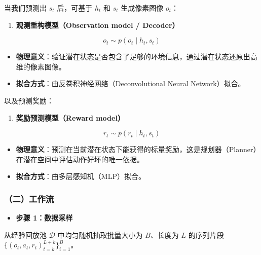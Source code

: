 当我们预测出 \(s_t\) 后，可基于 \(h_t\) 和 \(s_t\) 生成像素图像 \(o_t\)：

\begin{enumerate}
\def\labelenumi{\arabic{enumi}.}
\setcounter{enumi}{3}
\tightlist
\item
  \textbf{观测重构模型（Observation model / Decoder）}
\end{enumerate}

\[
o_t \sim p(o_t \mid h_t, s_t)
\]

\begin{itemize}
\tightlist
\item
  \textbf{物理意义}：验证潜在状态是否包含了足够的环境信息，通过潜在状态还原出高维的像素图像。
\item
  \textbf{拟合方式}：由反卷积神经网络（Deconvolutional Neural Network）拟合。
\end{itemize}

以及预测奖励：

\begin{enumerate}
\def\labelenumi{\arabic{enumi}.}
\setcounter{enumi}{4}
\tightlist
\item
  \textbf{奖励预测模型（Reward model）}
\end{enumerate}

\[
r_t \sim p(r_t \mid h_t, s_t)
\]

\begin{itemize}
\tightlist
\item
  \textbf{物理意义}：预测在当前潜在状态下能获得的标量奖励，这是规划器（Planner）在潜在空间中评估动作好坏的唯一依据。
\item
  \textbf{拟合方式}：由多层感知机（MLP）拟合。
\end{itemize}

\hypertarget{ux4e8cux5de5ux4f5cux6d41-5}{%
\subsubsection{（二）工作流}\label{ux4e8cux5de5ux4f5cux6d41-5}}

\begin{itemize}
\tightlist
\item
  \textbf{步骤 1：数据采样}
\end{itemize}

从经验回放池 \(\mathcal{D}\) 中均匀随机抽取批量大小为 \(B\)、长度为 \(L\) 的序列片段 \(\lbrace(o_t, a_t, r_t)_{t=k}^{L+k}\rbrace_{i=1}^{B}\)。

